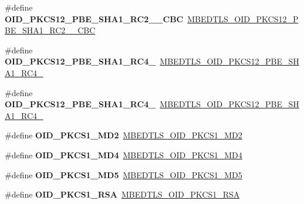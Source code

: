 \begin{DoxyCompactItemize}
\#define {\bfseries O\+I\+D\+\_\+\+P\+K\+C\+S12\+\_\+\+P\+B\+E\+\_\+\+S\+H\+A1\+\_\+\+R\+C2\+\_\+\_\+\+C\+BC}~\mbox{\hyperlink{oid_8h_aa680c0462de66573a7f3a0f0de930c57}{M\+B\+E\+D\+T\+L\+S\+\_\+\+O\+I\+D\+\_\+\+P\+K\+C\+S12\+\_\+\+P\+B\+E\+\_\+\+S\+H\+A1\+\_\+\+R\+C2\+\_\+\_\+\+C\+BC}}
\item 
\mbox{\label{compat-1_83_8h_abb06fa6854c5c9c2bba45669a3c86b7f}} 
\#define {\bfseries O\+I\+D\+\_\+\+P\+K\+C\+S12\+\_\+\+P\+B\+E\+\_\+\+S\+H\+A1\+\_\+\+R\+C4\+\_}~\mbox{\hyperlink{oid_8h_a2350b20503431bc5f7a9c91d50a358e1}{M\+B\+E\+D\+T\+L\+S\+\_\+\+O\+I\+D\+\_\+\+P\+K\+C\+S12\+\_\+\+P\+B\+E\+\_\+\+S\+H\+A1\+\_\+\+R\+C4\+\_}}
\item 
\mbox{\label{compat-1_83_8h_aa6306a80eb221ed58dc1a37585aad85d}} 
\#define {\bfseries O\+I\+D\+\_\+\+P\+K\+C\+S12\+\_\+\+P\+B\+E\+\_\+\+S\+H\+A1\+\_\+\+R\+C4\+\_}~\mbox{\hyperlink{oid_8h_af920a658a053560ecd15da391d8a21c2}{M\+B\+E\+D\+T\+L\+S\+\_\+\+O\+I\+D\+\_\+\+P\+K\+C\+S12\+\_\+\+P\+B\+E\+\_\+\+S\+H\+A1\+\_\+\+R\+C4\+\_}}
\item 
\mbox{\label{compat-1_83_8h_a89463340cd4abd80744a74d949ccf127}} 
\#define {\bfseries O\+I\+D\+\_\+\+P\+K\+C\+S1\+\_\+\+M\+D2}~\mbox{\hyperlink{oid_8h_a7cded731af9f9b31560ddd5275150508}{M\+B\+E\+D\+T\+L\+S\+\_\+\+O\+I\+D\+\_\+\+P\+K\+C\+S1\+\_\+\+M\+D2}}
\item 
\mbox{\label{compat-1_83_8h_a3bddb9824400870a99b024e473f49d81}} 
\#define {\bfseries O\+I\+D\+\_\+\+P\+K\+C\+S1\+\_\+\+M\+D4}~\mbox{\hyperlink{oid_8h_a397d7f5d219f4853131f615bb8f22408}{M\+B\+E\+D\+T\+L\+S\+\_\+\+O\+I\+D\+\_\+\+P\+K\+C\+S1\+\_\+\+M\+D4}}
\item 
\mbox{\label{compat-1_83_8h_a2e73c54fa978e56850f62b2d877a018f}} 
\#define {\bfseries O\+I\+D\+\_\+\+P\+K\+C\+S1\+\_\+\+M\+D5}~\mbox{\hyperlink{oid_8h_a94c671bace8030d886c47a6d05f6502f}{M\+B\+E\+D\+T\+L\+S\+\_\+\+O\+I\+D\+\_\+\+P\+K\+C\+S1\+\_\+\+M\+D5}}
\item 
\mbox{\label{compat-1_83_8h_a89f411612e522c42397ebfd1f9b83fef}} 
\#define {\bfseries O\+I\+D\+\_\+\+P\+K\+C\+S1\+\_\+\+R\+SA}~\mbox{\hyperlink{oid_8h_a07dd2515d8e69934e974db139251d968}{M\+B\+E\+D\+T\+L\+S\+\_\+\+O\+I\+D\+\_\+\+P\+K\+C\+S1\+\_\+\+R\+SA}}

\end{DoxyCompactItemize}
